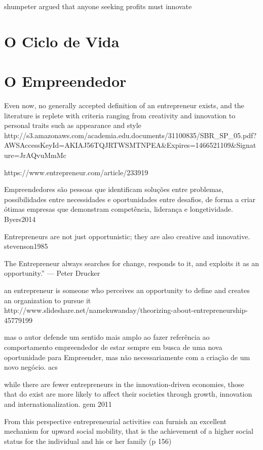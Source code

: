 shumpeter argued that anyone seeking profits must innovate

\section{O Ciclo de Vida}
\label{section:o_modelo_de_negocios}

\section{O Empreendedor}
\label{section:o_empreendedor}

 Even now, no
generally accepted definition
of an entrepreneur exists, and
the literature is replete with
criteria ranging from creativity
and innovation to personal
traits such as appearance and
style http://s3.amazonaws.com/academia.edu.documents/31100835/SBR_SP_05.pdf?AWSAccessKeyId=AKIAJ56TQJRTWSMTNPEA&Expires=1466521109&Signature=JrAQvuMmMc%

https://www.entrepreneur.com/article/233919

Empreendedores são pessoas que identificam soluções entre problemas, possibilidades entre necessidades e oportunidades entre desafios, de forma a criar ótimas empresas que demonstram competência, liderança e longetividade. Byers2014

Entrepreneurs are not just opportunistic; they are also creative and innovative. stevenson1985

The Entrepreneur always searches for change, responds to it, and exploits it as an opportunity.”  — Peter Drucker

an entrepreneur is someone who perceives an opportunity to define and creates an organization to pursue it http://www.slideshare.net/namekuwanday/theorizing-about-entrepreneurship-45779199

 mas o autor defende um sentido mais amplo ao fazer referência ao comportamento empreendedor de estar sempre em busca de uma nova oportunidade para Empreender, mas não necessariamente com a criação de um novo negócio. acs

while there are fewer
entrepreneurs in the innovation-driven economies, those
that do exist are more likely to affect their societies
through growth, innovation and internationalization. gem 2011

 From this
perspective entrepreneurial activities can furnish an excellent mechanism for upward
social mobility, that is the achievement of a higher social status for the individual and his
or her family (p 156)

